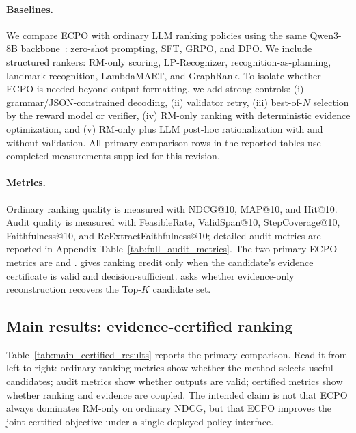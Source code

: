\documentclass{article}
\begin{document}
\paragraph{Baselines.}
We compare ECPO with ordinary LLM ranking policies using the same Qwen3-8B backbone~\citep{yang_qwen3_2025}: zero-shot prompting, SFT, GRPO, and DPO. We include structured rankers: RM-only scoring, LP-Recognizer, recognition-as-planning, landmark recognition, LambdaMART, and GraphRank. To isolate whether ECPO is needed beyond output formatting, we add strong controls: (i) grammar/JSON-constrained decoding, (ii) validator retry, (iii) best-of-$N$ selection by the reward model or verifier, (iv) RM-only ranking with deterministic evidence optimization, and (v) RM-only plus LLM post-hoc rationalization with and without validation. All primary comparison rows in the reported tables use completed measurements supplied for this revision.

\paragraph{Metrics.}
Ordinary ranking quality is measured with NDCG@10, MAP@10, and Hit@10. Audit quality is measured with FeasibleRate, ValidSpan@10, StepCoverage@10, Faithfulness@10, and ReExtractFaithfulness@10; detailed audit metrics are reported in Appendix Table~\ref{tab:full_audit_metrics}. The two primary ECPO metrics are  and .  gives ranking credit only when the candidate's evidence certificate is valid and decision-sufficient.  asks whether evidence-only reconstruction recovers the Top-$K$ candidate set.

\subsection{Main results: evidence-certified ranking}
\label{sec:exp_results}

Table~\ref{tab:main_certified_results} reports the primary comparison. Read it from left to right: ordinary ranking metrics show whether the method selects useful candidates; audit metrics show whether outputs are valid; certified metrics show whether ranking and evidence are coupled. The intended claim is not that ECPO always dominates RM-only on ordinary NDCG, but that ECPO improves the joint certified objective under a single deployed policy interface.
\end{document}
